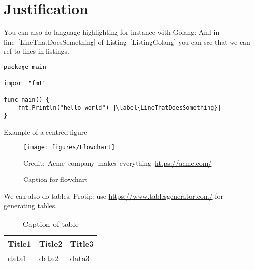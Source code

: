     \section{Justification}

You can also do language highlighting for instance with Golang:
And in line~\ref{LineThatDoesSomething} of Listing~\ref{ListingGolang} you can see that we can ref to lines in listings.

\begin{lstlisting}[caption={Hello world in Golang},label=ListingGolang,escapechar=|]
package main

import "fmt"

func main() {
    fmt.Println("hello world") |\label{LineThatDoesSomething}|
}

\end{lstlisting}



Example of a centred figure
\begin{figure}[H]
    \centering
    \texttt{[image: figures/Flowchart]}
    \caption{Caption for flowchart}
  	\medskip 
	\hspace*{15pt}\hbox{\scriptsize Credit: Acme company makes everything \url{https://acme.com/}}
    \label{FlowchartFigure}
\end{figure}



We can also do tables. Protip: use \url{https://www.tablesgenerator.com/} for generating tables.
\begin{table}[H]
\centering
\caption{Caption of table}
\label{TableLabel}
\begin{tabular}{|l|l|l|}
\hline
Title1 & Title2 & Title3 \\ \hline
data1  & data2  & data3  \\ \hline
\end{tabular}
\end{table}

